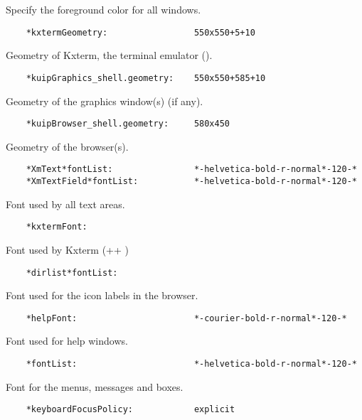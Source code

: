    Specify the foreground color for all windows.

\begin{verbatim}
    *kxtermGeometry:                 550x550+5+10
\end{verbatim}

   Geometry of Kxterm, the \KUIP{} terminal emulator (\EW).

\begin{verbatim}
    *kuipGraphics_shell.geometry:    550x550+585+10
\end{verbatim}

   Geometry of the graphics window(s) (if any).

\begin{verbatim}
    *kuipBrowser_shell.geometry:     580x450
\end{verbatim}

   Geometry of the browser(s).

\begin{verbatim}
    *XmText*fontList:                *-helvetica-bold-r-normal*-120-*
    *XmTextField*fontList:           *-helvetica-bold-r-normal*-120-*
\end{verbatim}

   Font used by all text areas.

\begin{verbatim}
    *kxtermFont:
\end{verbatim}

   Font used by Kxterm (\PAW++{} \EW)

\begin{verbatim}
    *dirlist*fontList:
\end{verbatim}

   Font used for the icon labels in the browser.

\begin{verbatim}
    *helpFont:                       *-courier-bold-r-normal*-120-*
\end{verbatim}

   Font used for help windows.

\begin{verbatim}
    *fontList:                       *-helvetica-bold-r-normal*-120-*
\end{verbatim}

   Font for the menus, messages and boxes.

\begin{verbatim}
    *keyboardFocusPolicy:            explicit
\end{verbatim}


